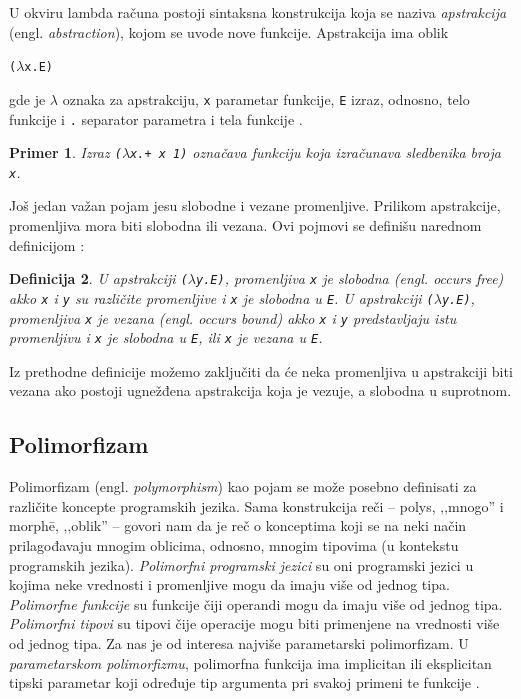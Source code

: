\documentclass[a4paper]{article}
\newtheorem{primer}{Primer}[section]
\newtheorem{definicija}[primer]{Definicija}
\begin{document}
U okviru lambda računa postoji sintaksna konstrukcija koja se naziva \textit{apstrakcija} (engl. \textit{abstraction}), kojom se uvode nove funkcije. Apstrakcija ima oblik
\begin{center}
	\verb|(|$\lambda$\verb|x.E)|
\end{center} 
gde je $\lambda$ oznaka za apstrakciju, \verb|x| parametar funkcije, \verb|E| izraz, odnosno, telo funkcije i \verb|.| separator parametra i tela funkcije \cite{the-implementation-of-functional-programming-languages}.  
\begin{primer}
	Izraz \verb|(|$\lambda$\verb|x.+ x 1)| označava funkciju koja izračunava sledbenika broja \verb|x|.
\end{primer}


Još jedan važan pojam jesu slobodne i vezane promenljive. Prilikom apstrakcije, promenljiva mora biti slobodna ili vezana. Ovi pojmovi se definišu narednom definicijom \cite{the-implementation-of-functional-programming-languages}:

\begin{definicija}
	U apstrakciji \verb|(|$\lambda$\verb|y.E)|, promenljiva \verb|x| je \textit{slobodna} (engl. \textit{occurs free}) akko \verb|x| i \verb|y| su različite promenljive i \verb|x| je slobodna u \verb|E|. U apstrakciji \verb|(|$\lambda$\verb|y.E)|, promenljiva \verb|x| je \textit{vezana} (engl. \textit{occurs bound}) akko \verb|x| i \verb|y| predstavljaju istu promenljivu i \verb|x| je slobodna u \verb|E|, ili \verb|x| je vezana u \verb|E|.
\end{definicija}

Iz prethodne definicije možemo zaključiti da će neka promenljiva u apstrakciji biti vezana ako postoji ugnežđena apstrakcija koja je vezuje, a slobodna u suprotnom.

\subsection{Polimorfizam}
\label{subsec:polimorfizam}


Polimorfizam (engl. \textit{polymorphism}) kao pojam se može posebno definisati za različite koncepte programskih jezika. Sama konstrukcija reči -- polys, ‚‚mnogo'' i morph\={e}, ‚‚oblik'' -- govori nam da je reč o konceptima koji se na neki način prilagođavaju mnogim oblicima, odnosno, mnogim tipovima (u kontekstu programskih jezika). \textit{Polimorfni programski jezici} su oni programski jezici u kojima neke vrednosti i promenljive mogu da imaju više od jednog tipa. \textit{Polimorfne funkcije} su funkcije čiji operandi mogu da imaju više od jednog tipa. \textit{Polimorfni tipovi} su tipovi čije operacije mogu biti primenjene na vrednosti više od jednog tipa. Za nas je od interesa najviše parametarski polimorfizam. U \textit{parametarskom polimorfizmu}, polimorfna funkcija ima implicitan ili eksplicitan tipski parametar koji određuje tip argumenta pri svakoj primeni te funkcije \cite{On-Understanding-Types-Data-Abstraction-and-Polymorphism}.
\end{document}
